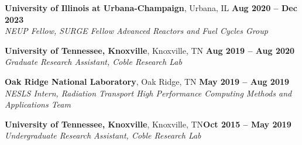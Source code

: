 \documentclass[margin,line]{resume}
\begin{document}
\begin{resume}
    \textbf{University of Illinois at Urbana-Champaign}, Urbana, IL \hfill \textbf{Aug 2020 -- Dec 2023} \\
    \vspace{-6mm}
        \textsl{NEUP Fellow, SURGE Fellow Advanced Reactors and Fuel Cycles Group} \\\vspace{-2mm}
        
    \textbf{University of Tennessee, Knoxville}, Knoxville, TN \hfill \textbf{Aug 2019 -- Aug 2020}\\
    \vspace{-6mm}
        \textsl{Graduate Research Assistant, Coble Research Lab} \\ \vspace{-2mm}
    
    \textbf{Oak Ridge National Laboratory}, Oak Ridge, TN \hfill \textbf{May 2019 -- Aug 2019}\\
    \vspace{-6mm}        
        \textsl{NESLS Intern, Radiation Transport High Performance Computing Methods and Applications Team}\\ \vspace{-2mm}              
    
    \textbf{University of Tennessee, Knoxville}, Knoxville, TN\hfill\textbf{Oct 2015 -- May 2019}\\
    \vspace{-6mm}            
        \textsl{Undergraduate Research Assistant, Coble Research Lab}\\\vspace{-2mm}

    


\end{resume}
\end{document}

